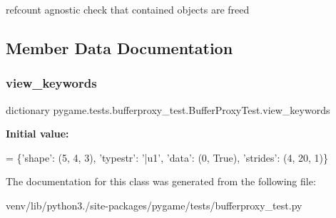 \begin{DoxyVerb}refcount agnostic check that contained objects are freed\end{DoxyVerb}
 

\subsection{Member Data Documentation}
\mbox{\label{classpygame_1_1tests_1_1bufferproxy__test_1_1_buffer_proxy_test_af0fe1fb2eedff2be5d3d4c322c1fff65}} 
\subsubsection{\texorpdfstring{view\+\_\+keywords}{view\_keywords}}
{\footnotesize\ttfamily dictionary pygame.\+tests.\+bufferproxy\+\_\+test.\+Buffer\+Proxy\+Test.\+view\+\_\+keywords\hspace{0.3cm}{\ttfamily [static]}}

{\bfseries Initial value\+:}
\begin{DoxyCode}
=  \{\textcolor{stringliteral}{'shape'}: (5, 4, 3),
                     \textcolor{stringliteral}{'typestr'}: \textcolor{stringliteral}{'|u1'},
                     \textcolor{stringliteral}{'data'}: (0, \textcolor{keyword}{True}),
                     \textcolor{stringliteral}{'strides'}: (4, 20, 1)\}
\end{DoxyCode}


The documentation for this class was generated from the following file\+:\begin{DoxyCompactItemize}
\item 
venv/lib/python3./site-\/packages/pygame/tests/bufferproxy\+\_\+test.\+py\end{DoxyCompactItemize}
